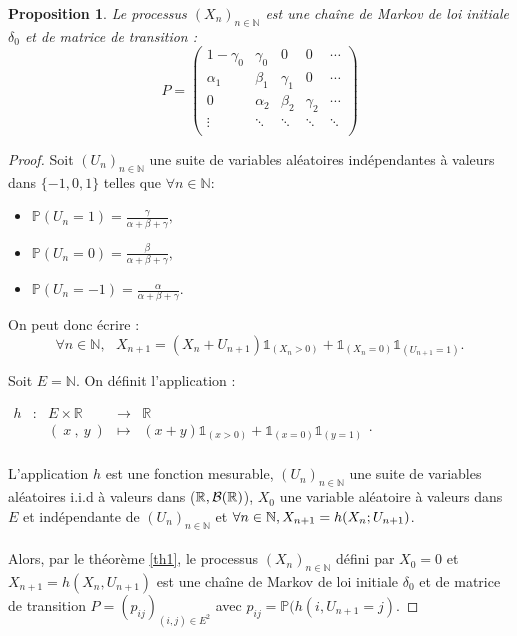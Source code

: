 \documentclass[12pt,a4paper]{report}
\newtheorem{prop}[thm]{Proposition}
\theoremstyle{remark}
\begin{document}
\begin{prop}\label{simple_markov}
Le processus $(X_n)_{n \in \mathbb{N}}$ est une chaîne de Markov de loi initiale $\delta_0$ et de matrice de transition :
$$P=
\begin{pmatrix}
        1-\gamma_0 & \gamma_0 & 0 & 0 & \cdots \\
         \alpha_1 & \beta_1 & \gamma_1 & 0 & \cdots\\
         0 & \alpha_2 & \beta_2 & \gamma_2 & \cdots\\
        \vdots &\ddots & \ddots & \ddots & \ddots \\
\end{pmatrix}$$
\end{prop}
\begin{proof}
Soit $(U_n)_{n\in \mathbb{N}}$ une suite de variables aléatoires indépendantes à valeurs dans $\{-1, 0, 1\}$ telles que $\forall n \in \mathbb{N}$: \\
\begin{itemize}
    \item $\mathbb{P}(U_n=1)= \frac{\gamma}{\alpha+\beta+\gamma},$
    \item $\mathbb{P}(U_n=0)= \frac{\beta}{\alpha+\beta+\gamma},$
    \item $\mathbb{P}(U_n=-1)= \frac{\alpha}{\alpha+\beta+\gamma}.$
\end{itemize}

\vspace{0.7cm}
On peut donc écrire :
$$\forall n \in \mathbb{N}, \ \ \ X_{n+1} = (X_n + U_{n+1}) \mathds{1}_{(X_n >0)} + \mathds{1}_{(X_n=0)}\mathds{1}_{(U_{n+1}=1)}.$$

Soit $E=\mathbb{N}$. On définit l'application  :
\begin{center}
$\begin{array}{ccccc}
h & : & E \times \mathbb{R} & \longrightarrow & \mathbb{R} \\
 & & (\ x \ ,\ y\ ) & \mapsto & (x + y) \mathds{1}_{(x >0)} + \mathds{1}_{(x=0)}\mathds{1}_{(y=1)}\\
\end{array}.$
\end{center}
 
\vspace{0.3cm}
L'application $h$ est une fonction mesurable, $(U_n)_{n\in\mathbb{N}}$ une suite de variables aléatoires i.i.d à valeurs dans ($\mathbb{R},\cal{B}(\mathbb{R})$), $X_0$ une variable aléatoire à valeurs dans $E$ et indépendante de $(U_n)_{n\in \mathbb{N}}$ et $\forall n \in \mathbb{N}, \ \\X_{n+1}=h(X_n;U_{n+1})$.
\\
\\
Alors, par le théorème \ref{th1}, le processus $(X_n)_{n\in\mathbb{N}}$ défini par $X_0 = 0$ et $X_{n+1}=h(X_n,U_{n+1})$ est une chaîne de Markov de loi initiale $\delta_0$ et de matrice de transition $P = (p_{ij})_{(i,j) \in E^2}$ avec $p_{ij} = \mathbb{P}(h(i, U_{n+1} = j)$.
\end{proof}
\vspace{0.5cm}
\end{document}
